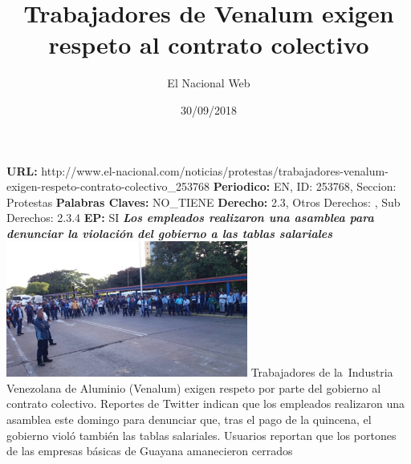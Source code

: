 \documentclass{article}%
\title{\textbf{Trabajadores de Venalum exigen respeto al contrato colectivo}}%
\author{El Nacional Web}%
\date{30/09/2018}%
\begin{document}
%
\normalsize%
\maketitle%
\textbf{URL: }%
http://www.el{-}nacional.com/noticias/protestas/trabajadores{-}venalum{-}exigen{-}respeto{-}contrato{-}colectivo\_253768\newline%
%
\textbf{Periodico: }%
EN, %
ID: %
253768, %
Seccion: %
Protestas\newline%
%
\textbf{Palabras Claves: }%
NO\_TIENE\newline%
%
\textbf{Derecho: }%
2.3, %
Otros Derechos: %
, %
Sub Derechos: %
2.3.4\newline%
%
\textbf{EP: }%
SI\newline%
\newline%
%
\textbf{\textit{Los empleados realizaron una asamblea para denunciar la violación del gobierno a las tablas salariales}}%
\newline%
\newline%
%
\includegraphics[width=300px]{146.jpg}%
\newline%
%
Trabajadores de la~Industria Venezolana de Aluminio (Venalum) exigen respeto por parte del gobierno al contrato colectivo.%
\newline%
%
Reportes de Twitter indican que los empleados realizaron una asamblea este domingo para denunciar que, tras el pago de la quincena, el gobierno violó también las tablas salariales.%
\newline%
%
Usuarios reportan que los portones de las empresas básicas de Guayana amanecieron cerrados%
\newline%
%
\end{document}
